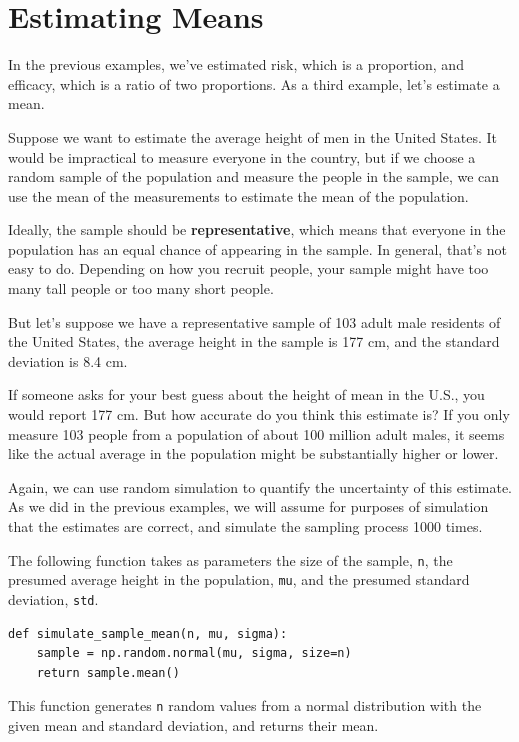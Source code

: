 \hypertarget{estimating-means}{%
\section{Estimating Means}\label{estimating-means}}

In the previous examples, we've estimated risk, which is a proportion,
and efficacy, which is a ratio of two proportions. As a third example,
let's estimate a mean.

Suppose we want to estimate the average height of men in the United
States. It would be impractical to measure everyone in the country, but
if we choose a random sample of the population and measure the people in
the sample, we can use the mean of the measurements to estimate the mean
of the population.

Ideally, the sample should be \textbf{representative}, which means that
everyone in the population has an equal chance of appearing in the
sample. In general, that's not easy to do. Depending on how you recruit
people, your sample might have too many tall people or too many short
people.

But let's suppose we have a representative sample of 103 adult male
residents of the United States, the average height in the sample is 177
cm, and the standard deviation is 8.4 cm.

If someone asks for your best guess about the height of mean in the
U.S., you would report 177 cm. But how accurate do you think this
estimate is? If you only measure 103 people from a population of about
100 million adult males, it seems like the actual average in the
population might be substantially higher or lower.

Again, we can use random simulation to quantify the uncertainty of this
estimate. As we did in the previous examples, we will assume for
purposes of simulation that the estimates are correct, and simulate the
sampling process 1000 times.

The following function takes as parameters the size of the sample,
\passthrough{\lstinline!n!}, the presumed average height in the
population, \passthrough{\lstinline!mu!}, and the presumed standard
deviation, \passthrough{\lstinline!std!}.

\begin{lstlisting}[]
def simulate_sample_mean(n, mu, sigma):
    sample = np.random.normal(mu, sigma, size=n)
    return sample.mean()
\end{lstlisting}

This function generates \passthrough{\lstinline!n!} random values from a
normal distribution with the given mean and standard deviation, and
returns their mean.


